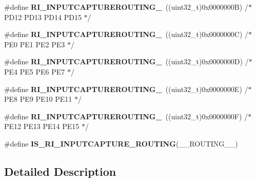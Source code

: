 \begin{DoxyCompactItemize}
\item 
\hypertarget{group___r_i___input_capture_routing_gad0f4578aca2f2969b01d2e286b7eaba3}{\#define {\bfseries R\-I\-\_\-\-I\-N\-P\-U\-T\-C\-A\-P\-T\-U\-R\-E\-R\-O\-U\-T\-I\-N\-G\-\_}~((uint32\-\_\-t)0x0000000\-B) /$\ast$ P\-D12      P\-D13     P\-D14      P\-D15     $\ast$/}\label{group___r_i___input_capture_routing_gad0f4578aca2f2969b01d2e286b7eaba3}

\item 
\hypertarget{group___r_i___input_capture_routing_gac3079d98c769abd5c341567043ed9139}{\#define {\bfseries R\-I\-\_\-\-I\-N\-P\-U\-T\-C\-A\-P\-T\-U\-R\-E\-R\-O\-U\-T\-I\-N\-G\-\_}~((uint32\-\_\-t)0x0000000\-C) /$\ast$ P\-E0       P\-E1      P\-E2       P\-E3      $\ast$/}\label{group___r_i___input_capture_routing_gac3079d98c769abd5c341567043ed9139}

\item 
\hypertarget{group___r_i___input_capture_routing_ga7afce070e1a949d2d6b3b4cf658dc97e}{\#define {\bfseries R\-I\-\_\-\-I\-N\-P\-U\-T\-C\-A\-P\-T\-U\-R\-E\-R\-O\-U\-T\-I\-N\-G\-\_}~((uint32\-\_\-t)0x0000000\-D) /$\ast$ P\-E4       P\-E5      P\-E6       P\-E7      $\ast$/}\label{group___r_i___input_capture_routing_ga7afce070e1a949d2d6b3b4cf658dc97e}

\item 
\hypertarget{group___r_i___input_capture_routing_ga7ce2ef383f9eb86cd52a68576ea5ebd4}{\#define {\bfseries R\-I\-\_\-\-I\-N\-P\-U\-T\-C\-A\-P\-T\-U\-R\-E\-R\-O\-U\-T\-I\-N\-G\-\_}~((uint32\-\_\-t)0x0000000\-E) /$\ast$ P\-E8       P\-E9      P\-E10      P\-E11     $\ast$/}\label{group___r_i___input_capture_routing_ga7ce2ef383f9eb86cd52a68576ea5ebd4}

\item 
\hypertarget{group___r_i___input_capture_routing_ga8b1a9aed68110aa0d5732b6d043b53ee}{\#define {\bfseries R\-I\-\_\-\-I\-N\-P\-U\-T\-C\-A\-P\-T\-U\-R\-E\-R\-O\-U\-T\-I\-N\-G\-\_}~((uint32\-\_\-t)0x0000000\-F) /$\ast$ P\-E12      P\-E13     P\-E14      P\-E15     $\ast$/}\label{group___r_i___input_capture_routing_ga8b1a9aed68110aa0d5732b6d043b53ee}

\item 
\#define {\bfseries I\-S\-\_\-\-R\-I\-\_\-\-I\-N\-P\-U\-T\-C\-A\-P\-T\-U\-R\-E\-\_\-\-R\-O\-U\-T\-I\-N\-G}(\-\_\-\-\_\-\-R\-O\-U\-T\-I\-N\-G\-\_\-\-\_\-)
\end{DoxyCompactItemize}


\subsection{Detailed Description}


